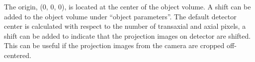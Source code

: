 The origin, (0, 0, 0), is located at the center of the object volume.  A shift can be added to the object volume under ``object parameters''.  The default detector center is calculated with respect to the number of transaxial and axial pixels, a shift can be added to indicate that the projection images on detector are shifted.  This can be useful if the projection images from the camera are cropped off-centered.





